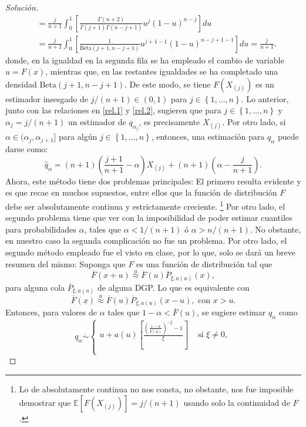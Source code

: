 \documentclass[10.5pt,notitlepage]{article}
\newenvironment{solucion}
  {\begin{proof}[Solución]}
  {\end{proof}}
\newcommand{\EE}{\mathbb{E}}
\newcommand{\approxu}{\overset{u}{\approx}}
\newcommand{\corch}[1]{\left[ #1 \right]}
\newcommand{\kis}[1]{\left\{ #1 \right\}}
\newcommand{\pare}[1]{\left( #1 \right)}
\theoremstyle{plain}
\begin{document}
\begin{solucion}
\begin{align*}
                          &= \frac{j}{n+1}\int_{0}^{1}\corch{ \frac{\Gamma(n + 2)}{\Gamma(j+1)\Gamma(n-j+1)}u^{j}(1 - u)^{n- j}}du\\ 
                          &= \frac{j}{n+1}\int_{0}^{1}\corch{ \frac{1}{\text{Beta}(j+1,n-j+1)}u^{j+1-1}(1 - u)^{n- j+1-1}}du= \frac{j}{n+1}.
\end{align*}
donde, en la igualdad en la segunda fila se ha empleado el cambio de variable \(u = F(x)\), mientras que, en las restantes igualdades se ha completado una densidad \(\text{Beta}(j+1,n-j+1)\). De este modo, se tiene \(F(X_{(j)})\) es un estimador insesgado de \(j/(n+1)\in(0,1)\) para \(j \in \kis{1, \hdots, n}\). Lo anterior, junto con las relaciones en \eqref{rel.1} y \eqref{rel.2}, sugieren que para \(j \in \kis{1, \hdots, n}\) y \(\alpha_j = j/(n+1)\) un estimador de \(q_{\alpha_j}\), es precisamente
\(X_{(j)}\). Por otro lado, si \(\alpha \in (\alpha_j, \alpha_{j+1}]\) para algún  \(j \in \kis{1, \hdots, n}\), entonces, una estimación para \(q_{\alpha}\) puede darse como:
\[
\hat{q}_{\alpha} = (n+1)\pare{\frac{j+1}{n+1} - \alpha}X_{(j)} + (n+1)\pare{\alpha - \frac{j}{n+1}}.
 \]
 Ahora, este método tiene dos problemas principales: El primero resulta evidente y es que recae en muchos supuestos, entre ellos que la función de distribución \(F\) debe ser absolutamente continua y estrictamente creciente. \footnote{Lo de absolutamente continua no nos consta, no obstante, nos fue imposible demostrar que \(\EE[F(X_{(j)})] = j/(n+1)\) usando solo la continuidad de \(F\).} Por otro lado, el segundo problema tiene que ver con la imposibilidad de poder estimar cuantiles para probabilidades \(\alpha\), tales que \(\alpha < 1/(n+1)\) ó \(\alpha > n/(n+1)\). No obstante, en nuestro caso la segunda complicación no fue un problema. Por otro lado, el segundo método empleado fue el visto en clase, por lo que, solo se dará un breve resumen del mismo: Suponga que \(F\) es una función de distribución tal que 
 \[
 \overline{F}(x+u) \approxu \overline{F}(u)\overline{P}_{\xi,a(u)}(x),
 \]
 para alguna cola \(\overline{P}_{\xi, a(u)}\) de alguna DGP. Lo que es equivalente con 
 \[
 \overline{F}(x) \approxu \overline{F}(u)\overline{P}_{\xi,a(u)}(x - u), \text{ con } x > u.
 \]
 Entonces, para valores de \(\alpha\) tales que \(1 - \alpha < \overline{F}(u)\), se sugiere estimar \(q_{\alpha}\) como 
 \[
 q_{\alpha} \overset{\cdot}{\sim} \begin{cases}
u + a(u)\corch{\frac{\pare{\frac{1 - \alpha}{\overline{F}(u)}}^{- \xi} -1}{\xi}} & \text{ si } \xi\neq 0, \\ 

\end{cases}\]
\end{solucion}
\end{document}
